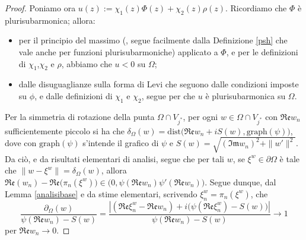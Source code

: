 \begin{proof}
    Poniamo ora $u(z):=\chi_1(z)\Phi(z)+\chi_2(z)\rho(z)$. Ricordiamo che $\Phi$ è plurisubarmonica; allora:
    \begin{itemize}
        \item per il principio del massimo (\cite[Corollary 2.1.5]{Kr}, segue facilmente dalla Definizione \ref{psh} che vale anche per funzioni plurisubarmoniche) applicato a $\Phi$, e per le definizioni di $\chi_1$,$\chi_2$ e $\rho$, abbiamo che $u<0$ su $\Omega$;
        \item dalle disuguaglianze sulla forma di Levi che seguono dalle condizioni imposte su $\phi$, e dalle definizioni di $\chi_1$ e $\chi_2$, segue per \cite[Excercise prior to Proposition 2.2.6]{Kr} che $u$ è plurisubarmonica su $\Omega$.
    \end{itemize}

    Per la simmetria di rotazione della punta $\Omega\cap V_{j^*}$, per ogni $w\in\Omega\cap V_{j^*}$ con $\mathfrak{Re}w_n$ sufficientemente piccolo si ha che $\delta_\Omega(w)=\text{dist}\big(\mathfrak{Re}w_n+iS(w),\text{graph}(\psi)\big)$, dove con $\text{graph}(\psi)$ s'intende il grafico di $\psi$ e $S(w)=\sqrt{(\mathfrak{Im}w_n)^2+\|w'\|^2}$. Da ciò, e da risultati elementari di analisi, segue che per tali $w$, se $\xi^w\in\partial\Omega$ è tale che $\|w-\xi^w\|=\delta_\Omega(w)$, allora $\mathfrak{Re}(w_n)-\mathfrak{Re}\big(\pi_n(\xi^w)\big)\in\big(0,\psi(\mathfrak{Re}w_n)\psi'(\mathfrak{Re}w_n)\big)$. Segue dunque, dal Lemma \ref{analisibase} e da stime elementari, scrivendo $\xi^w_n=\pi_n(\xi^w)$, che
    $$\frac{\partial_\Omega(w)}{\psi(\mathfrak{Re}w_n)-S(w)}=\frac{\left|(\mathfrak{Re}\xi^w_n-\mathfrak{Re}w_n)+i\big(\psi(\mathfrak{Re}\xi^w_n)-S(w)\big)\right|}{\psi(\mathfrak{Re}w_n)-S(w)}\longrightarrow 1$$
    per $\mathfrak{Re}w_n\longrightarrow 0$.
\end{proof}